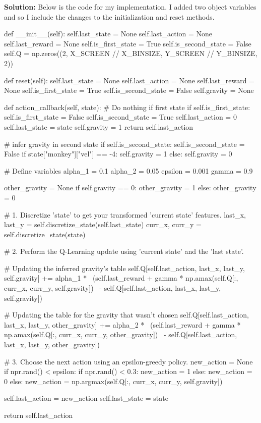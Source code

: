 \documentclass[submit]{harvardml}
\begin{document}
\newpage
\textbf{Solution:}
Below is the code for my implementation. I added two object variables and so I include
the changes to the initialization and reset methods.
\begin{python}
def __init__(self):
    self.last_state = None
    self.last_action = None
    self.last_reward = None
    self.is_first_state = True
    self.is_second_state = False
    self.Q = np.zeros((2, X_SCREEN // X_BINSIZE, Y_SCREEN // Y_BINSIZE, 2))

def reset(self):
    self.last_state = None
    self.last_action = None
    self.last_reward = None
    self.is_first_state = True
    self.is_second_state = False
    self.gravity = None

def action_callback(self, state):
    # Do nothing if first state
    if self.is_first_state:
        self.is_first_state = False
        self.is_second_state = True
        self.last_action = 0
        self.last_state = state
        self.gravity = 1
        return self.last_action

    # infer gravity in second state
    if self.is_second_state:
        self.is_second_state = False
        if state["monkey"]["vel"] == -4:
            self.gravity = 1
        else:
            self.gravity = 0

    # Define variables
    alpha_1 = 0.1
    alpha_2 = 0.05
    epsilon = 0.001
    gamma = 0.9

    other_gravity = None
    if self.gravity == 0:
        other_gravity = 1
    else:
        other_gravity = 0

    # 1. Discretize 'state' to get your transformed 'current state' features.
    last_x, last_y = self.discretize_state(self.last_state)
    curr_x, curr_y = self.discretize_state(state)

    # 2. Perform the Q-Learning update using 'current state' and the 'last state'.

    # Updating the inferred gravity's table
    self.Q[self.last_action, last_x, last_y, self.gravity] += alpha_1 * \
        (self.last_reward + gamma * np.amax(self.Q[:, curr_x, curr_y, self.gravity]) \
            - self.Q[self.last_action, last_x, last_y, self.gravity])

    # Updating the table for the gravity that wasn't chosen
    self.Q[self.last_action, last_x, last_y, other_gravity] += alpha_2 * \
        (self.last_reward + gamma * np.amax(self.Q[:, curr_x, curr_y, other_gravity]) \
            - self.Q[self.last_action, last_x, last_y, other_gravity])

    # 3. Choose the next action using an epsilon-greedy policy.
    new_action = None
    if npr.rand() < epsilon:
        if npr.rand() < 0.3:
            new_action = 1
        else:
            new_action = 0
    else:
        new_action = np.argmax(self.Q[:, curr_x, curr_y, self.gravity])

    self.last_action = new_action
    self.last_state = state

    return self.last_action
\end{python}
\end{document}

